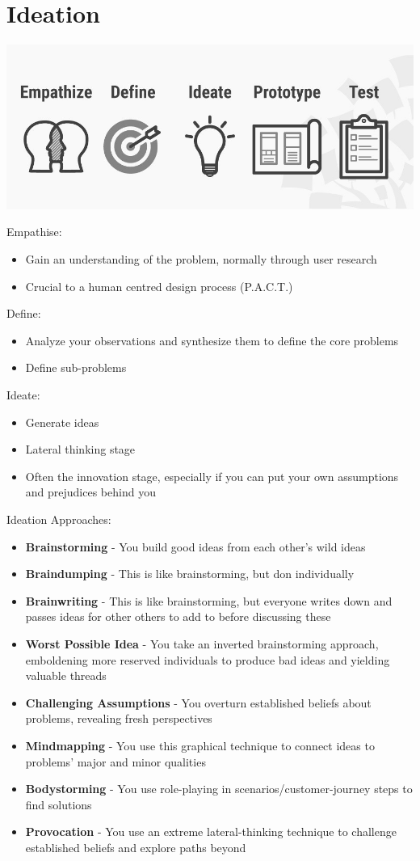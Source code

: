 \documentclass{article}[18pt]
\begin{document}
\section{Ideation}
\begin{center}
	\includegraphics[scale=0.7]{Ideation}
\end{center}
Empathise:
\begin{itemize}
	\item Gain an understanding of the problem, normally through user research
	\item Crucial to a human centred design process (P.A.C.T.)
\end{itemize}
Define:
\begin{itemize}
	\item Analyze your observations and synthesize them to define the core problems
	\item Define sub-problems
\end{itemize}
Ideate:
\begin{itemize}
	\item Generate ideas
	\item Lateral thinking stage
	\item Often the innovation stage, especially if you can put your own assumptions and prejudices behind you
\end{itemize}
Ideation Approaches:
\begin{itemize}
	\item \textbf{Brainstorming} - You build good ideas from each other's wild ideas
	\item \textbf{Braindumping} - This is like brainstorming, but don individually
	\item \textbf{Brainwriting} - This is like brainstorming, but everyone writes down and passes ideas for other others to add to before discussing these
	\item \textbf{Worst Possible Idea} - You take an inverted brainstorming approach, emboldening more reserved individuals to produce bad ideas and yielding valuable threads
	\item \textbf{Challenging Assumptions} - You overturn established beliefs about problems, revealing fresh perspectives
	\item \textbf{Mindmapping} - You use this graphical technique to connect ideas to problems' major and minor qualities
	\item \textbf{Bodystorming} - You use role-playing in scenarios/customer-journey steps to find solutions
	\item \textbf{Provocation} - You use an extreme lateral-thinking technique to challenge established beliefs and explore paths beyond
\end{itemize}
\end{document}
